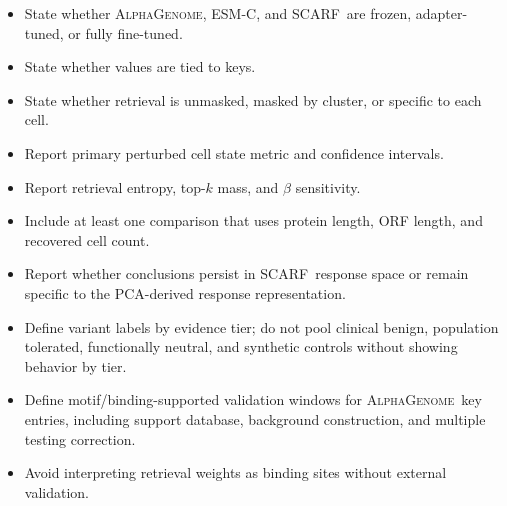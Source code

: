 \documentclass{article}
\newcommand{\ag}{\textsc{AlphaGenome}}
\newcommand{\scarf}{\textsc{SCARF}}
\newcommand{\esm}{\textsc{ESM-C}}
\begin{document}
\begin{itemize}
    \item State whether \ag, \esm, and \scarf\ are frozen, adapter-tuned, or fully fine-tuned.
    \item State whether values are tied to keys.
    \item State whether retrieval is unmasked, masked by cluster, or specific to each cell.
    \item Report primary perturbed cell state metric and confidence intervals.
    \item Report retrieval entropy, top-\(k\) mass, and \(\beta\) sensitivity.
    \item Include at least one comparison that uses protein length, ORF length, and recovered cell count.
    \item Report whether conclusions persist in \scarf\ response space or remain specific to the PCA-derived response representation.
    \item Define variant labels by evidence tier; do not pool clinical benign, population tolerated, functionally neutral, and synthetic controls without showing behavior by tier.
    \item Define motif/binding-supported validation windows for \ag\ key entries, including support database, background construction, and multiple testing correction.
    \item Avoid interpreting retrieval weights as binding sites without external validation.
\end{itemize}
\end{document}
